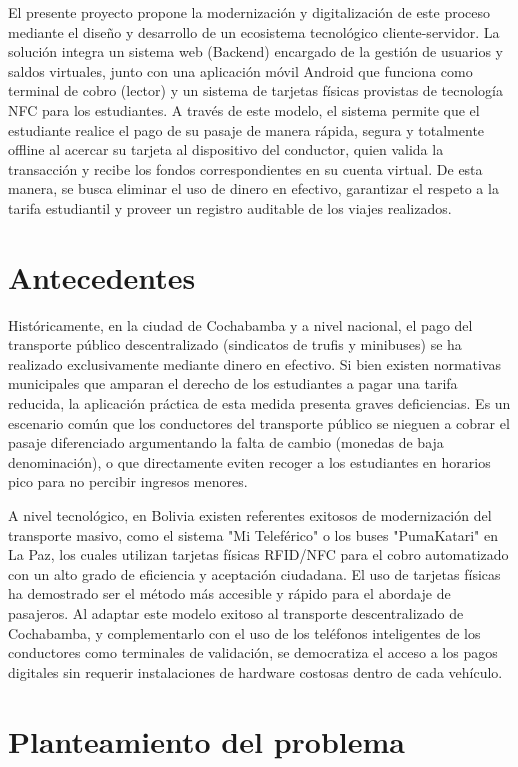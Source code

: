\documentclass[12pt,letterpaper]{report}
\begin{document}
	El presente proyecto propone la modernización y digitalización de este proceso mediante el diseño y desarrollo de un ecosistema tecnológico cliente-servidor. La solución integra un sistema web (Backend) encargado de la gestión de usuarios y saldos virtuales, junto con una aplicación móvil Android que funciona como terminal de cobro (lector) y un sistema de tarjetas físicas provistas de tecnología NFC para los estudiantes. A través de este modelo, el sistema permite que el estudiante realice el pago de su pasaje de manera rápida, segura y totalmente offline al acercar su tarjeta al dispositivo del conductor, quien valida la transacción y recibe los fondos correspondientes en su cuenta virtual. De esta manera, se busca eliminar el uso de dinero en efectivo, garantizar el respeto a la tarifa estudiantil y proveer un registro auditable de los viajes realizados.
	
	\section{Antecedentes}
	
	Históricamente, en la ciudad de Cochabamba y a nivel nacional, el pago del transporte público descentralizado (sindicatos de trufis y minibuses) se ha realizado exclusivamente mediante dinero en efectivo. Si bien existen normativas municipales que amparan el derecho de los estudiantes a pagar una tarifa reducida, la aplicación práctica de esta medida presenta graves deficiencias. Es un escenario común que los conductores del transporte público se nieguen a cobrar el pasaje diferenciado argumentando la falta de cambio (monedas de baja denominación), o que directamente eviten recoger a los estudiantes en horarios pico para no percibir ingresos menores.
	
	A nivel tecnológico, en Bolivia existen referentes exitosos de modernización del transporte masivo, como el sistema "Mi Teleférico" o los buses "PumaKatari" en La Paz, los cuales utilizan tarjetas físicas RFID/NFC para el cobro automatizado con un alto grado de eficiencia y aceptación ciudadana. El uso de tarjetas físicas ha demostrado ser el método más accesible y rápido para el abordaje de pasajeros. Al adaptar este modelo exitoso al transporte descentralizado de Cochabamba, y complementarlo con el uso de los teléfonos inteligentes de los conductores como terminales de validación, se democratiza el acceso a los pagos digitales sin requerir instalaciones de hardware costosas dentro de cada vehículo.
	
	\section{Planteamiento del problema}
	
\end{document}
